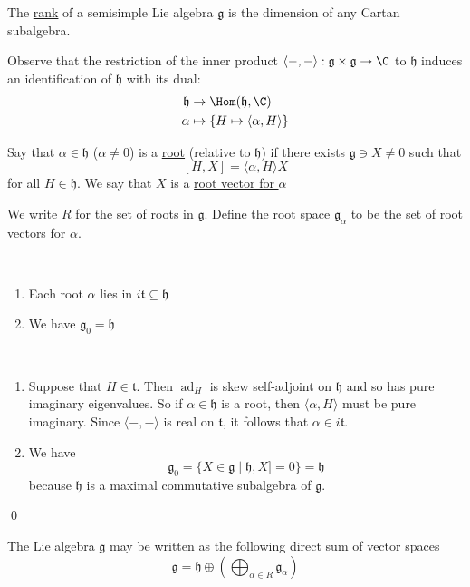 \documentclass[x11names,reqno,14pt]{extarticle}
\newcommand{\mk}[1]{\mathfrak{#1}}
\newcommand{\g}{\mk{g}}
\newcommand{\h}{\mk{h}}
\DeclareMathOperator{\ad}{ad}
\begin{document}
The \underline{rank} of a semisimple Lie algebra $\g$ is the dimension of any Cartan subalgebra.

Observe that the restriction of the inner product $\langle-,-\rangle:\g\times\g\to\C$ to $\h$ induces an identification of $\h$ with its dual:
\begin{align*}
\h & \to \Hom(\h,\C)\\
\alpha&\mapsto \{H\mapsto \langle \alpha, H \rangle \}
\end{align*}


Say that $\alpha\in\h$ ($\alpha\neq0$) is a \underline{root} (relative to $\h$) if there exists $\g\ni X\neq0$ such that
\[
[H,X] = \langle \alpha, H \rangle X
\]
for all $H \in \h$. We say that $X$ is a \underline{root vector for $\alpha$}

We write $R$ for the set of roots in $\g$. Define the \underline{root space} $\g_\alpha$ to be the set of root vectors for $\alpha$. 

\prop
\,
\begin{enumerate}[label=(\alph*)]

\item Each root $\alpha$ lies in $i\mk{t}\subseteq\h$ 

\item We have $\g_0= \h$

\end{enumerate}

\proof
\,
\begin{enumerate}[label=(\alph*)]

\item Suppose that $H \in \mk{t}$. Then $\ad_H$ is skew self-adjoint on $\h$ and so has pure imaginary eigenvalues. So if $\alpha\in\h$ is a root, then $\langle\alpha, H\rangle$ must be pure imaginary. Since $\langle-,-\rangle$ is real on $\mk{t}$, it follows that $\alpha\in i\mk{t}$. 

\item We have 
\[
\g_0 = \{X\in\g\mid \h, X] = 0\} = \h
\]
because $\h$ is a maximal commutative subalgebra of $\g$. 

\end{enumerate}

\qed

\thm 

The Lie algebra $\g$ may be written as the following direct sum of vector spaces
\[
\g = \h \oplus \left(\bigoplus_{\alpha\in R}\g_\alpha \right)
\]

\proof
\end{document}
